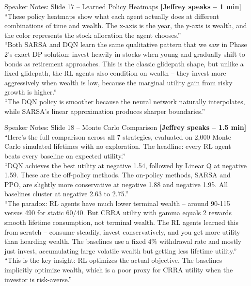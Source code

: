 \documentclass[aspectratio=169, 11pt]{beamer}
\begin{document}
\begin{frame}[allowframebreaks]{Speaker Notes: Slide 17 -- Learned Policy Heatmaps}
\textbf{[Jeffrey speaks -- 1 min]}\\
``These policy heatmaps show what each agent actually does at different combinations of time and wealth. The x-axis is the year, the y-axis is wealth, and the color represents the stock allocation the agent chooses.''\\[0.5em]
``Both SARSA and DQN learn the same qualitative pattern that we saw in Phase 2's exact DP solution: invest heavily in stocks when young and gradually shift to bonds as retirement approaches. This is the classic glidepath shape, but unlike a fixed glidepath, the RL agents also condition on wealth -- they invest more aggressively when wealth is low, because the marginal utility gain from risky growth is higher.''\\[0.5em]
``The DQN policy is smoother because the neural network naturally interpolates, while SARSA's linear approximation produces sharper boundaries.''
\end{frame}

\begin{frame}[allowframebreaks]{Speaker Notes: Slide 18 -- Monte Carlo Comparison}
\textbf{[Jeffrey speaks -- 1.5 min]}\\
``Here's the full comparison across all 7 strategies, evaluated on 2,000 Monte Carlo simulated lifetimes with no exploration. The headline: every RL agent beats every baseline on expected utility.''\\[0.5em]
``DQN achieves the best utility at negative 1.54, followed by Linear Q at negative 1.59. These are the off-policy methods. The on-policy methods, SARSA and PPO, are slightly more conservative at negative 1.88 and negative 1.95. All baselines cluster at negative 2.63 to 2.75.''\\[0.5em]
``The paradox: RL agents have much lower terminal wealth -- around 90-115 versus 490 for static 60/40. But CRRA utility with gamma equals 2 rewards smooth lifetime consumption, not terminal wealth. The RL agents learned this from scratch -- consume steadily, invest conservatively, and you get more utility than hoarding wealth. The baselines use a fixed 4\% withdrawal rate and mostly just invest, accumulating large volatile wealth but getting less lifetime utility.''\\[0.5em]
``This is the key insight: RL optimizes the actual objective. The baselines implicitly optimize wealth, which is a poor proxy for CRRA utility when the investor is risk-averse.''
\end{frame}
\end{document}
